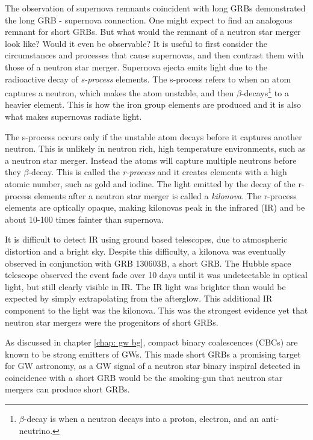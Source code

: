 \documentclass[11pt]{cuthesis}
\begin{document}
The observation of supernova remnants coincident with long GRBs demonstrated the long GRB - supernova connection. One might expect to find an analogous remnant for short GRBs. But what would the remnant of a neutron star merger look like? Would it even be observable? It is useful to first consider the circumstances and processes that cause supernovas, and then contrast them with those of a neutron star merger. Supernova ejecta emits light due to the radioactive decay of \textit{s-process} elements. The s-process refers to when an atom captures a neutron, which makes the atom unstable, and then $\beta$-decays\footnote{$\beta$-decay is when a neutron decays into a proton, electron, and an anti-neutrino.} to a heavier element. This is how the iron group elements are produced and it is also what makes supernovas radiate light.

The s-process occurs only if the unstable atom decays before it captures another neutron. This is unlikely in neutron rich, high temperature environments, such as a neutron star merger. Instead the atoms will capture multiple neutrons before they $\beta$-decay. This is called the \textit{r-process} and it creates elements with a high atomic number, such as gold and iodine. The light emitted by the decay of the r-process elements after a neutron star merger is called a \textit{kilonova}. The r-process elements are optically opaque, making kilonovas peak in the infrared (IR) and be about 10-100 times fainter than supernova. 

It is difficult to detect IR using ground based telescopes, due to atmospheric distortion and a bright sky. Despite this difficulty, a kilonova was eventually observed in conjunction with GRB 130603B, a short GRB. The Hubble space telescope observed the event fade over 10 days until it was undetectable in optical light, but still clearly visible in IR. The IR light was brighter than would be expected by simply extrapolating from the afterglow. This additional IR component to the light was the kilonova. This was the strongest evidence yet that neutron star mergers were the progenitors of short GRBs. 

As discussed in chapter \ref{chap: gw bg}, compact binary coalescences (CBCs) are known to be strong emitters of GWs. This made short GRBs a promising target for GW astronomy, as a GW signal of a neutron star binary inspiral detected in coincidence with a short GRB would be the smoking-gun that neutron star mergers can produce short GRBs. 
\end{document}

